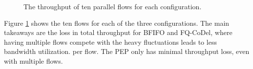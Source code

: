 \documentclass[a4paper,english, 11pt]{report}
\begin{document}
\begin{figure}[ht]
  \centering
  \hfill
  \hfill
  \caption{The throughput of ten parallel flows for each configuration.}
  \label{fig:completefig}
\end{figure}

Figure \ref{fig:completefig} shows the ten flows for each of the three configurations. The main takeaways are the loss in total throughput for BFIFO and FQ-CoDel, where having multiple flows compete with the heavy fluctuations leads to less bandwidth utilization. per flow. The PEP only has minimal throughput loss, even with multiple flows.\\
\end{document}
